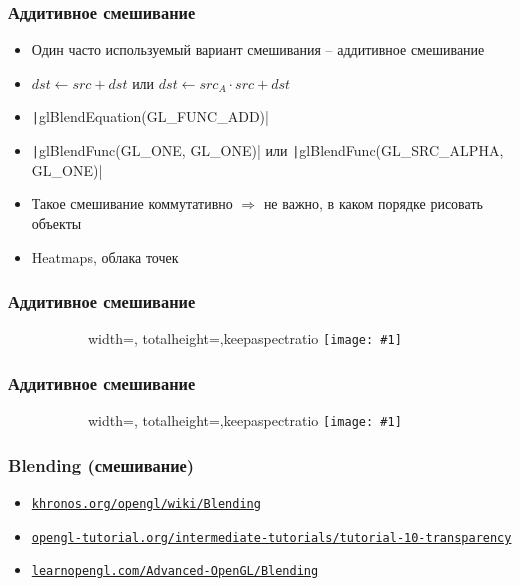 \documentclass[10pt]{beamer}
\newcommand{\slideimage}[1]{
  \begin{figure}
    \begin{adjustbox}{width=\textwidth, totalheight=\textheight-2\baselineskip-2\baselineskip,keepaspectratio}
      \texttt{[image: \#1]}
    \end{adjustbox}
  \end{figure}
}
\begin{document}
\begin{frame}[fragile]
\frametitle{Аддитивное смешивание}
\begin{itemize}
\item Один часто используемый вариант смешивания -- аддитивное смешивание
\item \begin{math}dst \leftarrow src + dst\end{math} или \begin{math}dst \leftarrow src_A \cdot src + dst\end{math}
\pause
\item \texttt|glBlendEquation(GL_FUNC_ADD)|
\item \texttt|glBlendFunc(GL_ONE, GL_ONE)| или \texttt|glBlendFunc(GL_SRC_ALPHA, GL_ONE)|
\pause
\item Такое смешивание коммутативно \begin{math}\Longrightarrow\end{math} не важно, в каком порядке рисовать объекты
\pause
\item Heatmaps, облака точек
\end{itemize}
\end{frame}

\begin{frame}
\frametitle{Аддитивное смешивание}
\begin{figure}
\slideimage{heatmap.jpg}
\end{figure}
\end{frame}

\begin{frame}
\frametitle{Аддитивное смешивание}
\begin{figure}
\slideimage{galaxy.jpg}
\end{figure}
\end{frame}

\begin{frame}[fragile]
\frametitle{Blending (смешивание)}
\begin{itemize}
\item \href{https://www.khronos.org/opengl/wiki/Blending}{\texttt{khronos.org/opengl/wiki/Blending}}
\item \href{http://www.opengl-tutorial.org/intermediate-tutorials/tutorial-10-transparency/}{\texttt{opengl-tutorial.org/intermediate-tutorials/tutorial-10-transparency}}
\item \href{https://learnopengl.com/Advanced-OpenGL/Blending}{\texttt{learnopengl.com/Advanced-OpenGL/Blending}}
\end{itemize}
\end{frame}
\end{document}
